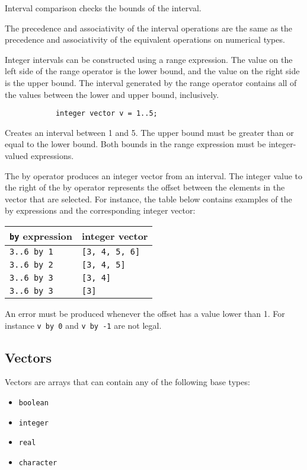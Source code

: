 \documentclass[../../gazprea.tex]{subfiles}
\begin{document}
		Interval comparison checks the bounds of the interval.

		The precedence and associativity of the interval operations are the same as the precedence and associativity of
		the equivalent operations on numerical types.

		Integer intervals can be constructed using a range expression. The value on the left side of the range operator
		is the lower bound, and the value on the right side is the upper bound. The interval generated by the range
		operator contains all of the values between the lower and upper bound, inclusively.

		\begin{lstlisting}
			integer vector v = 1..5;
		\end{lstlisting}

		Creates an interval between 1 and 5. The upper bound must be greater than or equal to the lower bound. Both
		bounds in the range expression must be integer-valued expressions.

		The by operator produces an integer vector from an interval. The integer value to the right of the by operator
		represents the offset between the elements in the vector that are selected. For instance, the table below
		contains examples of the by expressions and the corresponding integer vector:

		\begin{center}
			\begin{tabular}{|l|l|}
			\hline
			\textbf{\texttt{by} expression} & \textbf{integer vector} \\
			\hline
			\texttt{3..6 by 1} & \texttt{[3, 4, 5, 6]} \\
			\texttt{3..6 by 2} & \texttt{[3, 4, 5]}    \\
			\texttt{3..6 by 3} & \texttt{[3, 4]}       \\
			\texttt{3..6 by 3} & \texttt{[3]}          \\
			\hline
			\end{tabular}
		\end{center}

		An error must be produced whenever the offset has a value lower than 1. For instance \texttt{v by 0} and
		\texttt{v by -1} are not legal.


	\subsection{Vectors}\label{sec:vector}

		Vectors are arrays that can contain any of the following base types:
		\begin{itemize}
			\item \texttt{boolean}
			\item \texttt{integer}
			\item \texttt{real}
			\item \texttt{character}
		\end{itemize}
\end{document}
